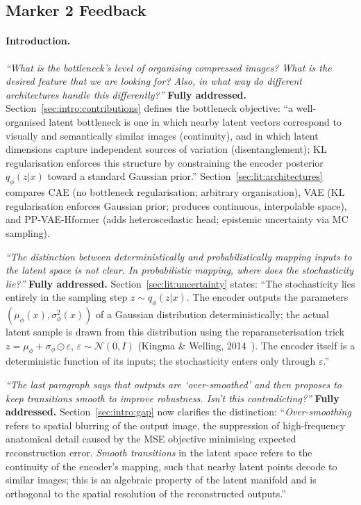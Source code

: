 \documentclass[12pt, a4paper, twoside, openright]{book}
\begin{document}
\begin{appendices}
\section*{Marker 2 Feedback}

\paragraph{Introduction.}
\textit{``What is the bottleneck's level of organising compressed images? What is the desired feature that we are looking for? Also, in what way do different architectures handle this differently?''}
\textbf{Fully addressed.} Section~\ref{sec:intro:contributions} defines the bottleneck objective: ``a well-organised latent bottleneck is one in which nearby latent vectors correspond to visually and semantically similar images (continuity), and in which latent dimensions capture independent sources of variation (disentanglement); KL regularisation enforces this structure by constraining the encoder posterior $q_\phi(z|x)$ toward a standard Gaussian prior.'' Section~\ref{sec:lit:architectures} compares CAE (no bottleneck regularisation; arbitrary organisation), VAE (KL regularisation enforces Gaussian prior; produces continuous, interpolable space), and PP-VAE-Hformer (adds heteroscedastic head; epistemic uncertainty via MC sampling).

\textit{``The distinction between deterministically and probabilistically mapping inputs to the latent space is not clear. In probabilistic mapping, where does the stochasticity lie?''}
\textbf{Fully addressed.} Section~\ref{sec:lit:uncertainty} states: ``The stochasticity lies entirely in the sampling step $z \sim q_\phi(z|x)$. The encoder outputs the parameters $(\mu_\phi(x), \sigma^2_\phi(x))$ of a Gaussian distribution deterministically; the actual latent sample is drawn from this distribution using the reparameterisation trick $z = \mu_\phi + \sigma_\phi \odot \varepsilon$, $\varepsilon \sim \mathcal{N}(0,I)$ (Kingma \& Welling, 2014~\cite{kingma_auto-encoding_2014}). The encoder itself is a deterministic function of its inputs; the stochasticity enters only through $\varepsilon$.''

\textit{``The last paragraph says that outputs are `over-smoothed' and then proposes to keep transitions smooth to improve robustness. Isn't this contradicting?''}
\textbf{Fully addressed.} Section~\ref{sec:intro:gap} now clarifies the distinction: ``\emph{Over-smoothing} refers to spatial blurring of the output image, the suppression of high-frequency anatomical detail caused by the MSE objective minimising expected reconstruction error. \emph{Smooth transitions} in the latent space refers to the continuity of the encoder's mapping, such that nearby latent points decode to similar images; this is an algebraic property of the latent manifold and is orthogonal to the spatial resolution of the reconstructed outputs.''


\end{appendices}
\end{document}
